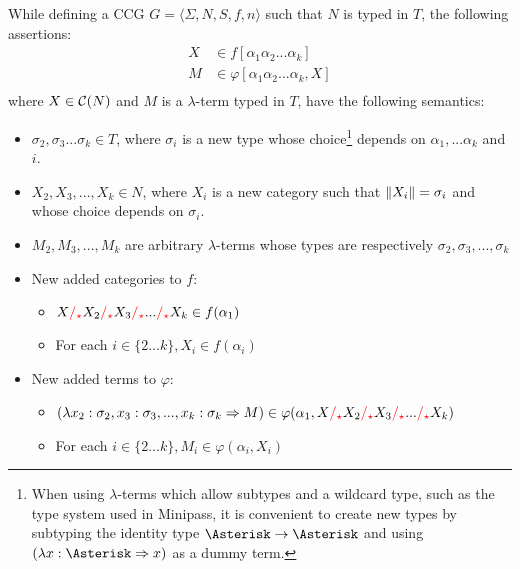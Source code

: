 \documentclass[main.tex]{subfiles}
\begin{document}
\begin{convention}
    \label{hack:phrases}

    While defining a CCG $G = \langle \Sigma, N, S, f, n \rangle$ such that
    $N$ is typed in $T$,
    the following assertions:
    \begin{align*}
        X &\in f[\alpha_1 \alpha_2 ... \alpha_k] \\
        M &\in \varphi[\alpha_1 \alpha_2 ... \alpha_k, X] \\
    \end{align*}
    where $X \in \mathcal{C}( N )$ and $M$ is a $\lambda$-term typed in $T$, have
    the following semantics:
    \begin{itemize}
        \item $\sigma_2, \sigma_3 ... \sigma_k \in T$, where $\sigma_i$ is a new type
            whose choice\footnote{
                When using $\lambda$-terms which allow subtypes and a wildcard type,
                such as the type system used in Minipass, it is
                convenient to create new types by subtyping the identity type
                $\wildcard \tot \wildcard$ and using
                $(\lambda x: \wildcard \abstr x)$ as a dummy term.
            }
            depends on $\alpha_1, ... \alpha_k$ and $i$.
        \item $X_2, X_3, ..., X_k \in N$, where $X_i$ is a new category
            such that $\|X_i\| = \sigma_i$ and whose choice
            depends on $\sigma_i$.
        \item $M_2, M_3, ..., M_k$ are arbitrary $\lambda$-terms whose types are
            respectively $\sigma_2, \sigma_3, ..., \sigma_k$
        \item New added categories to $f$:
            \begin{itemize}
                \item $X \textcolor{red}{/_{\star}} X_2 \textcolor{red}{/_{\star}} X_3
                    \textcolor{red}{/_{\star}} ... \textcolor{red}{/_{\star}} X_k \in f(\alpha_1)$
                \item For each $i \in \{ 2 ... k \}, X_i \in f(\alpha_i)$
            \end{itemize}
        \item New added terms to $\varphi$:
            \begin{itemize}
                \item $(\lambda x_2: \sigma_2, x_3: \sigma_3, ..., x_k: \sigma_k \Rightarrow
                    M) \in \varphi(\alpha_1, X \textcolor{red}{/_{\star}} X_2 \textcolor{red}{/_{\star}} X_3
                    \textcolor{red}{/_{\star}} ... \textcolor{red}{/_{\star}} X_k)$
                \item For each $i \in \{ 2 ... k \}, M_i \in \varphi(\alpha_i, X_i)$
            \end{itemize}
    \end{itemize}
\end{convention}
\end{document}
